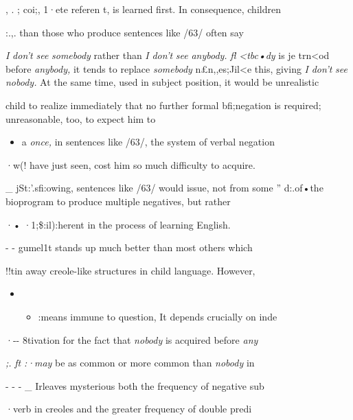, . ; coi;, 1·ete referen t, is learned first. In consequence, children

:.,. than those who produce sentences like /63/ often say

\textit{I} \textit{don't} \textit{see} \textit{somebo}\textit{d}\textit{y} rather than \textit{I} \textit{don't} \textit{see} \textit{anybody.} \textit{fl} \textit{{\textless}tbc•dy} is je trn{\textless}od before \textit{anybody,} it tends to replace \textit{somebo}\textit{d}\textit{y} n£n,,es;Jil{\textless}e this, giving \textit{I} \textit{don't} \textit{see nobody.} At the same time, used in subject position, it would be unrealistic

child to realize immediately that no further formal bfi;negation is required; unreasonable, too, to expect him to

\begin{itemize}
\item a \textit{once,} in sentences like /63/, the system of verbal negation
\end{itemize}

·w(! have just seen, cost him so much difficulty to acquire.

\_ jSt:'.sfi:owing, sentences like /63/ would issue, not from some '' d:.of•the bioprogram to produce multiple negatives, but rather

·• ·1;\$:il):herent in the process of learning English.

{}- {}- gumel1t stands up much better than most others which

!!tin away creole-like structures in child language. However,

\begin{itemize}
\item \begin{itemize}
\item :means immune to question, It depends crucially on inde\-
\end{itemize}
\end{itemize}

·{}-{}- 8tivation for the fact that \textit{nobody }is acquired before \textit{any\-}

\textit{;.} \textit{ft} \textit{:}\textit{·}\textit{may} be as common or more common than \textit{nobo}\textit{d}\textit{y} in

{}- {}- {}- \_ Irleaves mysterious both the frequency of negative sub\-

·verb in creoles and the greater frequency of double predi\-

